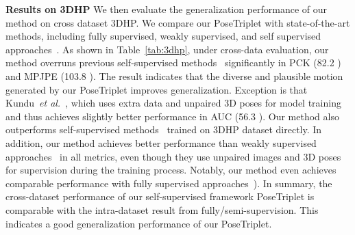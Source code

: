 \documentclass[10pt,twocolumn,letterpaper]{article}
\newcommand{\nameofmethod}{PoseTriplet}
\newcommand{\et}{\emph{et al.}}
\begin{document}
\noindent \textbf{Results on 3DHP} 
We then evaluate the generalization performance of our method on cross dataset 3DHP. 
We compare our \nameofmethod{} with state-of-the-art methods, including fully supervised, weakly supervised, and self supervised approaches~\cite{mehta2017vnect, sun2019human, kolotouros2019spin, chen2019unsupervised, kundu2020kinematic, kundu2020self, yu2021towards}.
As shown in Table~\ref{tab:3dhp}, under cross-data evaluation, our method overruns previous self-supervised methods~\cite{chen2019unsupervised, kundu2020self, yu2021towards} significantly in PCK (82.2 ) and MPJPE (103.8 ).
The result indicates that the diverse and plausible motion generated by our \nameofmethod{} improves generalization.
Exception is that Kundu~\et~\cite{kundu2020self}, which uses extra data and unpaired 3D poses for model training and thus achieves slightly better performance in AUC (56.3 ).
Our method also outperforms self-supervised methods~\cite{chen2019unsupervised, kundu2020kinematic, kundu2020self, yu2021towards} trained on 3DHP dataset directly.
In addition, our method achieves better performance than weakly supervised approaches~\cite{sun2019human, kolotouros2019spin} in all metrics, even though they use unpaired images and 3D poses for supervision during the training process.
Notably, our method even achieves comparable performance with fully supervised approaches~\cite{mehta2017vnect, sun2019human, kolotouros2019spin}).
{In summary, the cross-dataset performance of our self-supervised framework \nameofmethod{} is comparable with the intra-dataset result from fully/semi-supervision. This indicates a good generalization performance of our \nameofmethod{}.}
\end{document}
